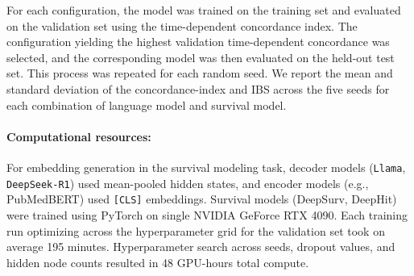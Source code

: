 For each configuration, the model was trained on the training set and evaluated on the validation set using the time-dependent concordance index. 
The configuration yielding the highest validation time-dependent concordance was selected, and the corresponding model was then evaluated on the held-out test set. 
This process was repeated for each random seed.
We report the mean and standard deviation of the concordance-index and IBS across the five seeds for each combination of language model and survival model. 

\paragraph{Computational resources:}
For embedding generation in the survival modeling task, decoder models (\texttt{Llama}, \texttt{DeepSeek-R1}) used mean-pooled hidden states, and encoder models (e.g., PubMedBERT) used \texttt{[CLS]} embeddings. Survival models (DeepSurv, DeepHit) were trained using PyTorch on single NVIDIA GeForce RTX 4090. Each training run optimizing across the hyperparameter grid for the validation set took on average 195 minutes. Hyperparameter search across seeds, dropout values, and hidden node counts resulted in 48 GPU-hours total compute.